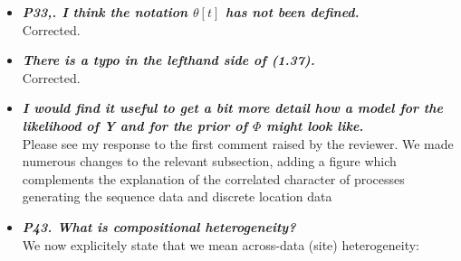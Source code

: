 \documentclass[english]{article}
\begin{document}
\begin{itemize}
\begin{quote}
\myeditsveleven
\end{quote}

\item {
{\it
\textbf{
P33,. I think the notation $\theta[t]$ has not been defined.
}%
}%
}%
\\
Corrected.




\item {
{\it
\textbf{
There is a typo in the lefthand side of (1.37).
}%
}%
}%
\\
Corrected.


\item {
{\it
\textbf{
I would find it useful to get a bit more detail how a model for the likelihood of Y and for the prior of $\Phi$ might look like.
}%
}%
}%
\\
Please see my response to the first comment raised by the reviewer. 
We made numerous changes to the relevant subsection, adding a figure which complements the explanation of the correlated character of processes generating the sequence data and discrete location data




\item {
{\it
\textbf{
P43. What is compositional heterogeneity?
}%
}%
}%
\\
We now explicitely state that we mean across-data (site) heterogeneity:

\begin{quote}
\myeditsvfifteen
\end{quote}



\end{itemize}
\end{document}
